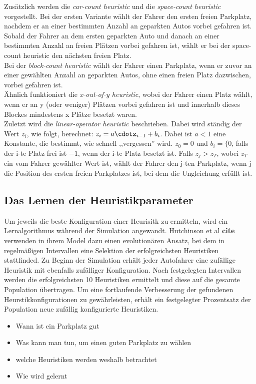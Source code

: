 Zusätzlich werden die \emph{car-count heuristic} und die \emph{space-count heuristic} vorgestellt. Bei der ersten Variante wählt der Fahrer den ersten freien Parkplatz, nachdem er an einer bestimmten Anzahl an geparkten Autos vorbei gefahren ist. Sobald der Fahrer an dem ersten geparkten Auto und danach an einer bestimmten Anzahl an freien Plätzen vorbei gefahren ist, wählt er bei der space-count heuristic den nächsten freien Platz.\\
Bei der \emph{block-count heuristic} wählt der Fahrer einen Parkplatz, wenn er zuvor an einer gewählten Anzahl an geparkten Autos, ohne einen freien Platz dazwischen, vorbei gefahren ist.\\
Ähnlich funktioniert die \emph{x-out-of-y heuristic}, wobei der Fahrer einen Platz wählt, wenn er an y (oder weniger) Plätzen vorbei gefahren ist und innerhalb dieses Blockes mindestens x Plätze besetzt waren. \\
Zuletzt wird die \emph{linear-operator heuristic} beschrieben. Dabei wird ständig der Wert $z_i$, wie folgt, berechnet: $z_i=a\cdotz_{i-1}+b_i$. Dabei ist $a<1$ eine Konstante, die bestimmt, wie schnell ,,vergessen'' wird. $z_0=0$ und $b_i=\lbrace 0$, falls der i-te Platz frei ist $-1$, wenn der i-te Platz besetzt ist. %
Falls $z_j>z_T$, wobei $z_T$ ein vom Fahrer gewählter Wert ist, wählt der Fahrer den j-ten Parkplatz, wenn j die Position des ersten freien Parkplatzes ist, bei dem die Ungleichung erfüllt ist. 

\subsection{Das Lernen der Heuristikparameter}
Um jeweils die beste Konfiguration einer Heurisitk zu ermitteln, wird ein Lernalgorithmus während der Simulation angewandt. Hutchinson et al \textbf{cite} verwenden in ihrem Model dazu einen evolutionären Ansatz, bei dem in regelmäßigen Intervallen eine Selektion der erfolgreichsten Heuristiken stattfinded. Zu Beginn der Simulation erhält jeder Autofahrer eine zufällige Heuristik mit ebenfalls zufälliger Konfiguration. Nach festgelegten Intervallen werden die erfolgreichsten 10 Heuristiken ermittelt und diese auf die gesamte Population übertragen. Um eine fortlaufende Verbesserung der gefundenen Heurstikkonfigurationen zu gewährleisten, erhält ein festgelegter Prozentsatz der Population neue zufällig konfigurierte Heuristiken. 

\begin{itemize}
	\item Wann ist ein Parkplatz gut
	\item Was kann man tun, um einen guten Parkplatz zu wählen
	\item welche Heuristiken werden weshalb betrachtet
	\item Wie wird gelernt
\end{itemize}